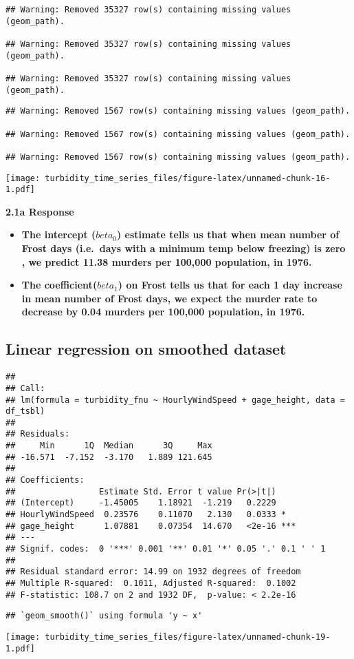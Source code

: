 \documentclass[
]{article}
\providecommand{\tightlist}{%
  \setlength{\itemsep}{0pt}\setlength{\parskip}{0pt}}
\begin{document}
\begin{verbatim}
## Warning: Removed 35327 row(s) containing missing values (geom_path).

## Warning: Removed 35327 row(s) containing missing values (geom_path).

## Warning: Removed 35327 row(s) containing missing values (geom_path).
\end{verbatim}

\begin{verbatim}
## Warning: Removed 1567 row(s) containing missing values (geom_path).

## Warning: Removed 1567 row(s) containing missing values (geom_path).

## Warning: Removed 1567 row(s) containing missing values (geom_path).
\end{verbatim}

\texttt{[image: turbidity\_time\_series\_files/figure-latex/unnamed-chunk-16-1.pdf]}

\textbf{2.1a Response}\\

\begin{itemize}
\tightlist
\item
  \textbf{The intercept (\(beta_0\)) estimate tells us that when mean
  number of Frost days (i.e.~days with a minimum temp below freezing) is
  zero , we predict 11.38 murders per 100,000 population, in 1976.}\\
\item
  \textbf{The coefficient(\(beta_1\)) on Frost tells us that for each 1
  day increase in mean number of Frost days, we expect the murder rate
  to decrease by 0.04 murders per 100,000 population, in 1976.}\\
\end{itemize}

\hypertarget{linear-regression-on-smoothed-dataset}{%
\subsection{Linear regression on smoothed
dataset}\label{linear-regression-on-smoothed-dataset}}

\begin{verbatim}
## 
## Call:
## lm(formula = turbidity_fnu ~ HourlyWindSpeed + gage_height, data = df_tsbl)
## 
## Residuals:
##     Min      1Q  Median      3Q     Max 
## -16.571  -7.152  -3.170   1.889 121.645 
## 
## Coefficients:
##                 Estimate Std. Error t value Pr(>|t|)    
## (Intercept)     -1.45005    1.18921  -1.219   0.2229    
## HourlyWindSpeed  0.23576    0.11070   2.130   0.0333 *  
## gage_height      1.07881    0.07354  14.670   <2e-16 ***
## ---
## Signif. codes:  0 '***' 0.001 '**' 0.01 '*' 0.05 '.' 0.1 ' ' 1
## 
## Residual standard error: 14.99 on 1932 degrees of freedom
## Multiple R-squared:  0.1011, Adjusted R-squared:  0.1002 
## F-statistic: 108.7 on 2 and 1932 DF,  p-value: < 2.2e-16
\end{verbatim}

\begin{verbatim}
## `geom_smooth()` using formula 'y ~ x'
\end{verbatim}

\texttt{[image: turbidity\_time\_series\_files/figure-latex/unnamed-chunk-19-1.pdf]}
\end{document}
